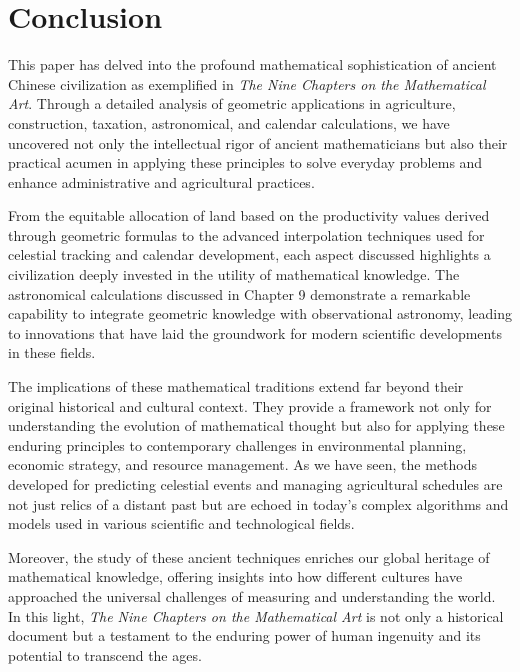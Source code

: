\documentclass[10pt]{article}
\begin{document}
\vspace{15pt}

\section{Conclusion}

\vspace{7pt}

This paper has delved into the profound mathematical sophistication of ancient Chinese civilization as exemplified in \textit{The Nine Chapters on the Mathematical Art}. Through a detailed analysis of geometric applications in agriculture, construction, taxation, astronomical, and calendar calculations, we have uncovered not only the intellectual rigor of ancient mathematicians but also their practical acumen in applying these principles to solve everyday problems and enhance administrative and agricultural practices.

\vspace{7pt}

From the equitable allocation of land based on the productivity values derived through geometric formulas to the advanced interpolation techniques used for celestial tracking and calendar development, each aspect discussed highlights a civilization deeply invested in the utility of mathematical knowledge. The astronomical calculations discussed in Chapter 9 demonstrate a remarkable capability to integrate geometric knowledge with observational astronomy, leading to innovations that have laid the groundwork for modern scientific developments in these fields.

\vspace{7pt}

The implications of these mathematical traditions extend far beyond their original historical and cultural context. They provide a framework not only for understanding the evolution of mathematical thought but also for applying these enduring principles to contemporary challenges in environmental planning, economic strategy, and resource management.  As we have seen, the methods developed for predicting celestial events and managing agricultural schedules are not just relics of a distant past but are echoed in today's complex algorithms and models used in various scientific and technological fields.

\vspace{7pt}

Moreover, the study of these ancient techniques enriches our global heritage of mathematical knowledge, offering insights into how different cultures have approached the universal challenges of measuring and understanding the world. In this light, \textit{The Nine Chapters on the Mathematical Art} is not only a historical document but a testament to the enduring power of human ingenuity and its potential to transcend the ages. 
\end{document}
